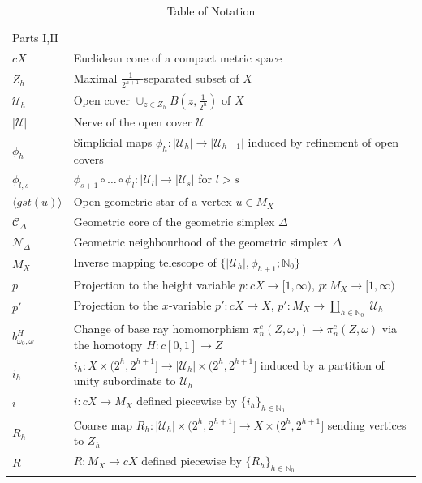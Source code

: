 \documentclass[a4paper,11pt]{article}
\theoremstyle{definition}
\theoremstyle{plain}
\theoremstyle{remark}
\begin{document}
\begin{table}
\caption{Table of Notation}
\begin{tabularx}{\textwidth}{p{}X}
\toprule
  Parts I,II \\
 $cX$ & Euclidean cone of a compact metric space\\
 $Z_{h}$ & Maximal $\frac{1}{2^{h+1}}$-separated subset of $X$\\
 $\mathcal{U}_{h}$ & Open cover $\cup_{z \in Z_{h}}B(z,\frac{1}{2^h})$ of $X$\\
$|\mathcal{U}|$ & Nerve of the open cover $\mathcal{U}$\\
$\phi_{h}$ & Simplicial maps $\phi_{h}: |\mathcal{U}_{h}| \rightarrow |\mathcal{U}_{h-1}|$ induced by refinement of open covers\\
 $\phi_{l,s}$ &  $\phi_{s+1}\circ \dots \circ \phi_{l}: |\mathcal{U}_{l}| \rightarrow |\mathcal{U}_{s}|$ for $l>s$\\
 $\langle gst(u) \rangle $ &  Open geometric star of a vertex $u\in M_{X}$\\
$\mathscr{C}_{\Delta} $ &  Geometric core of the geometric simplex $\Delta$\\
$\mathcal{N}_{\Delta}$ &  Geometric neighbourhood of the geometric simplex $\Delta$\\
 $M_{X}$ & Inverse mapping telescope of $\{|\mathcal{U}_{h}|, \phi_{h+1}; \mathbb{N}_{0}\}$\\
$p$ & Projection to the height variable $p: cX\rightarrow [1,\infty)$, $p: M_{X}\rightarrow [1,\infty)$  \\
$p'$ & Projection to the $x$-variable $p': cX\rightarrow X$, $p': M_{X}\rightarrow \coprod_{h\in \mathbb{N}_{0}} |\mathcal{U}_{h}| $ \\ 
$b^H_{\omega_{0},\omega}$ & Change of base ray homomorphism $\pi_{n}^c(Z,\omega_{0})\rightarrow \pi_{n}^c(Z,\omega)$ via the homotopy $H: c[0,1]\rightarrow Z$  \\
  $i_{h}$ & $i_{h}: X \times (2^h,2^{h+1}] \rightarrow |\mathcal{U}_{h}| \times (2^h,2^{h+1}]$ induced by a partition of unity subordinate to $\mathcal{U}_{h}$\\
  $i$ & $i: cX\rightarrow M_{X}$ defined piecewise by $\{i_{h}\}_{h\in \mathbb{N}_{0}}$\\
 $R_{h}$ & Coarse map $R_{h}: |\mathcal{U}_{h}| \times (2^h,2^{h+1}] \rightarrow X \times (2^h,2^{h+1}]$ sending vertices to $Z_h$  \\
  $R$ & $R: M_{X}\rightarrow cX$ defined piecewise by $\{R_{h}\}_{h\in \mathbb{N}_{0}}$\\

\end{tabularx}
\end{table}
\end{document}
